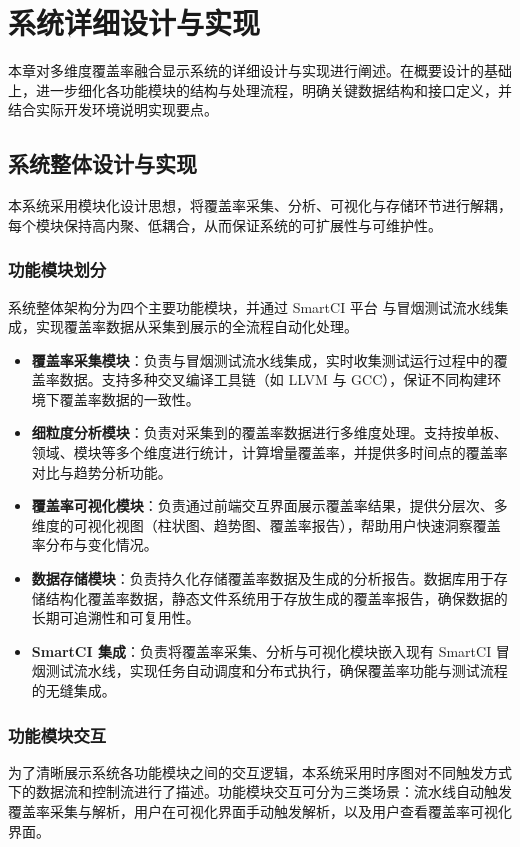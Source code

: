 
\chapter{系统详细设计与实现}
本章对多维度覆盖率融合显示系统的详细设计与实现进行阐述。在概要设计的基础上，进一步细化各功能模块的结构与处理流程，明确关键数据结构和接口定义，并结合实际开发环境说明实现要点。

\section{系统整体设计与实现}
本系统采用模块化设计思想，将覆盖率采集、分析、可视化与存储环节进行解耦，每个模块保持高内聚、低耦合，从而保证系统的可扩展性与可维护性。

\subsection{功能模块划分}
系统整体架构分为四个主要功能模块，并通过 SmartCI 平台 与冒烟测试流水线集成，实现覆盖率数据从采集到展示的全流程自动化处理。

\begin{itemize}
    \item \textbf{覆盖率采集模块}：负责与冒烟测试流水线集成，实时收集测试运行过程中的覆盖率数据。支持多种交叉编译工具链（如 LLVM 与 GCC），保证不同构建环境下覆盖率数据的一致性。
    \item \textbf{细粒度分析模块}：负责对采集到的覆盖率数据进行多维度处理。支持按单板、领域、模块等多个维度进行统计，计算增量覆盖率，并提供多时间点的覆盖率对比与趋势分析功能。
    \item \textbf{覆盖率可视化模块}：负责通过前端交互界面展示覆盖率结果，提供分层次、多维度的可视化视图（柱状图、趋势图、覆盖率报告），帮助用户快速洞察覆盖率分布与变化情况。
    \item \textbf{数据存储模块}：负责持久化存储覆盖率数据及生成的分析报告。数据库用于存储结构化覆盖率数据，静态文件系统用于存放生成的覆盖率报告，确保数据的长期可追溯性和可复用性。
    \item \textbf{SmartCI 集成}：负责将覆盖率采集、分析与可视化模块嵌入现有 SmartCI 冒烟测试流水线，实现任务自动调度和分布式执行，确保覆盖率功能与测试流程的无缝集成。
\end{itemize}

\subsection{功能模块交互}
为了清晰展示系统各功能模块之间的交互逻辑，本系统采用时序图对不同触发方式下的数据流和控制流进行了描述。功能模块交互可分为三类场景：流水线自动触发覆盖率采集与解析，用户在可视化界面手动触发解析，以及用户查看覆盖率可视化界面。


